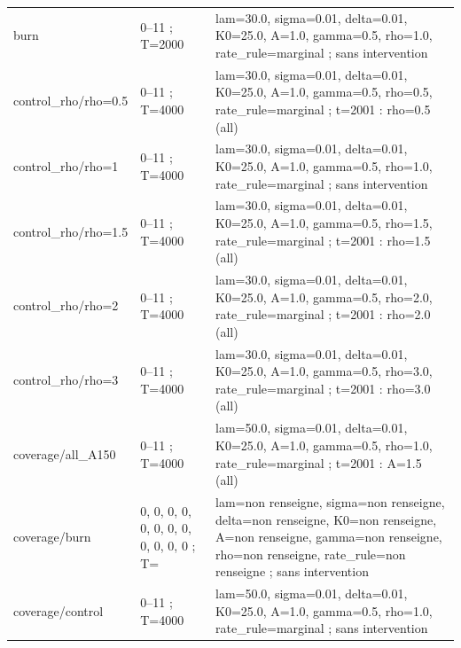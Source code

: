 {\begin{longtable}{@{}p{.27\linewidth}p{.14\linewidth}p{.53\linewidth}@{}}
burn & 0--11 ; T=2000 & lam=30.0,\allowbreak{}  sigma=0.01,\allowbreak{}  delta=0.01,\allowbreak{}  K0=25.0,\allowbreak{}  A=1.0,\allowbreak{}  gamma=0.5,\allowbreak{}  rho=1.0,\allowbreak{}  rate\_\allowbreak{}rule=marginal ; sans intervention \\
control\_\allowbreak{}rho/\allowbreak{}rho=0.5 & 0--11 ; T=4000 & lam=30.0,\allowbreak{}  sigma=0.01,\allowbreak{}  delta=0.01,\allowbreak{}  K0=25.0,\allowbreak{}  A=1.0,\allowbreak{}  gamma=0.5,\allowbreak{}  rho=0.5,\allowbreak{}  rate\_\allowbreak{}rule=marginal ; t=2001 : rho=0.5 (all) \\
control\_\allowbreak{}rho/\allowbreak{}rho=1 & 0--11 ; T=4000 & lam=30.0,\allowbreak{}  sigma=0.01,\allowbreak{}  delta=0.01,\allowbreak{}  K0=25.0,\allowbreak{}  A=1.0,\allowbreak{}  gamma=0.5,\allowbreak{}  rho=1.0,\allowbreak{}  rate\_\allowbreak{}rule=marginal ; sans intervention \\
control\_\allowbreak{}rho/\allowbreak{}rho=1.5 & 0--11 ; T=4000 & lam=30.0,\allowbreak{}  sigma=0.01,\allowbreak{}  delta=0.01,\allowbreak{}  K0=25.0,\allowbreak{}  A=1.0,\allowbreak{}  gamma=0.5,\allowbreak{}  rho=1.5,\allowbreak{}  rate\_\allowbreak{}rule=marginal ; t=2001 : rho=1.5 (all) \\
control\_\allowbreak{}rho/\allowbreak{}rho=2 & 0--11 ; T=4000 & lam=30.0,\allowbreak{}  sigma=0.01,\allowbreak{}  delta=0.01,\allowbreak{}  K0=25.0,\allowbreak{}  A=1.0,\allowbreak{}  gamma=0.5,\allowbreak{}  rho=2.0,\allowbreak{}  rate\_\allowbreak{}rule=marginal ; t=2001 : rho=2.0 (all) \\
control\_\allowbreak{}rho/\allowbreak{}rho=3 & 0--11 ; T=4000 & lam=30.0,\allowbreak{}  sigma=0.01,\allowbreak{}  delta=0.01,\allowbreak{}  K0=25.0,\allowbreak{}  A=1.0,\allowbreak{}  gamma=0.5,\allowbreak{}  rho=3.0,\allowbreak{}  rate\_\allowbreak{}rule=marginal ; t=2001 : rho=3.0 (all) \\
coverage/\allowbreak{}all\_\allowbreak{}A150 & 0--11 ; T=4000 & lam=50.0,\allowbreak{}  sigma=0.01,\allowbreak{}  delta=0.01,\allowbreak{}  K0=25.0,\allowbreak{}  A=1.0,\allowbreak{}  gamma=0.5,\allowbreak{}  rho=1.0,\allowbreak{}  rate\_\allowbreak{}rule=marginal ; t=2001 : A=1.5 (all) \\
coverage/\allowbreak{}burn & 0,\allowbreak{}  0,\allowbreak{}  0,\allowbreak{}  0,\allowbreak{}  0,\allowbreak{}  0,\allowbreak{}  0,\allowbreak{}  0,\allowbreak{}  0,\allowbreak{}  0,\allowbreak{}  0,\allowbreak{}  0 ; T= & lam=non renseigne,\allowbreak{}  sigma=non renseigne,\allowbreak{}  delta=non renseigne,\allowbreak{}  K0=non renseigne,\allowbreak{}  A=non renseigne,\allowbreak{}  gamma=non renseigne,\allowbreak{}  rho=non renseigne,\allowbreak{}  rate\_\allowbreak{}rule=non renseigne ; sans intervention \\
coverage/\allowbreak{}control & 0--11 ; T=4000 & lam=50.0,\allowbreak{}  sigma=0.01,\allowbreak{}  delta=0.01,\allowbreak{}  K0=25.0,\allowbreak{}  A=1.0,\allowbreak{}  gamma=0.5,\allowbreak{}  rho=1.0,\allowbreak{}  rate\_\allowbreak{}rule=marginal ; sans intervention \\
\bottomrule\end{longtable}}
